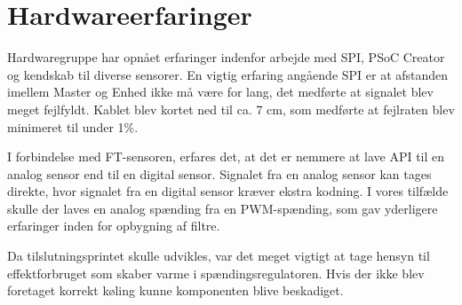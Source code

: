 \section{Hardwareerfaringer}

Hardwaregruppe har opnået erfaringer indenfor arbejde med SPI, PSoC Creator og kendskab til diverse sensorer. En vigtig erfaring angående SPI er at afstanden imellem Master og Enhed ikke må være for lang, det medførte at signalet blev meget fejlfyldt. Kablet blev kortet ned til ca. 7 cm, som medførte at fejlraten blev minimeret til under 1\%.

I forbindelse med FT-sensoren, erfares det, at det er nemmere at lave API til en analog sensor end til en digital sensor. Signalet fra en analog sensor kan tages direkte, hvor signalet fra en digital sensor kræver ekstra kodning. I vores tilfælde skulle der laves en analog spænding fra en PWM-spænding, som gav yderligere erfaringer inden for opbygning af filtre. 

Da tilslutningsprintet skulle udvikles, var det meget vigtigt at tage hensyn til effektforbruget som skaber varme i spændingsregulatoren. Hvis der ikke blev foretaget korrekt køling kunne komponenten blive beskadiget.  
